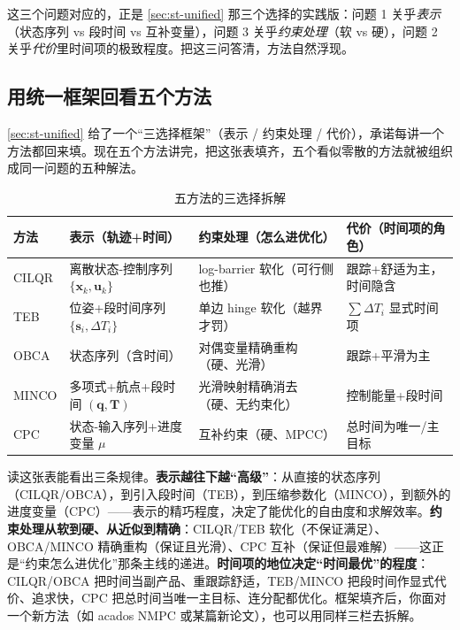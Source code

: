 \noindent 这三个问题对应的，正是 \cref{sec:st-unified} 那三个选择的实践版：问题 1 关乎\emph{表示}（状态序列 vs 段时间 vs 互补变量），问题 3 关乎\emph{约束处理}（软 vs 硬），问题 2 关乎\emph{代价}里时间项的极致程度。把这三问答清，方法自然浮现。

\subsection{用统一框架回看五个方法}
\label{sec:st-select-recap}

\cref{sec:st-unified} 给了一个“三选择框架”（表示 / 约束处理 / 代价），承诺每讲一个方法都回来填。现在五个方法讲完，把这张表填齐，五个看似零散的方法就被组织成同一问题的五种解法。

\begin{table}[H]\centering\small
\caption{五方法的三选择拆解}
\label{tab:st-three-choice}
\begin{tabular}{llll}
\toprule
方法 & 表示（轨迹+时间） & 约束处理（怎么进优化） & 代价（时间项的角色） \\
\midrule
CILQR & 离散状态-控制序列 $\{\mathbf x_k,\mathbf u_k\}$ & log-barrier 软化（可行侧也推） & 跟踪+舒适为主，时间隐含 \\
TEB & 位姿+段时间序列 $\{\mathbf s_i,\Delta T_i\}$ & 单边 hinge 软化（越界才罚） & $\sum\Delta T_i$ 显式时间项 \\
OBCA & 状态序列（含时间） & 对偶变量精确重构（硬、光滑） & 跟踪+平滑为主 \\
MINCO & 多项式+航点+段时间 $(\mathbf q,\mathbf T)$ & 光滑映射精确消去（硬、无约束化） & 控制能量+段时间 \\
CPC & 状态-输入序列+进度变量 $\mu$ & 互补约束（硬、MPCC） & 总时间为唯一/主目标 \\
\bottomrule
\end{tabular}
\end{table}

\noindent 读这张表能看出三条规律。\textbf{表示越往下越“高级”}：从直接的状态序列（CILQR/OBCA），到引入段时间（TEB），到压缩参数化（MINCO），到额外的进度变量（CPC）——表示的精巧程度，决定了能优化的自由度和求解效率。\textbf{约束处理从软到硬、从近似到精确}：CILQR/TEB 软化（不保证满足）、OBCA/MINCO 精确重构（保证且光滑）、CPC 互补（保证但最难解）——这正是“约束怎么进优化”那条主线的递进。\textbf{时间项的地位决定“时间最优”的程度}：CILQR/OBCA 把时间当副产品、重跟踪舒适，TEB/MINCO 把段时间作显式代价、追求快，CPC 把总时间当唯一主目标、连分配都优化。框架填齐后，你面对一个新方法（如 acados NMPC 或某篇新论文），也可以用同样三栏去拆解。

